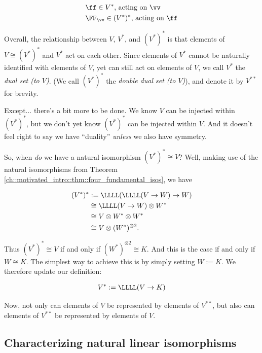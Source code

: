 \begin{deriv}
	\begin{align*}
		&\ff \in V^* \text{, acting on $\vv$} \\
		&\FF_{\vv} \in (V^*)^* \text{, acting on $\ff$}
	\end{align*}
	 
	 Overall, the relationship between $V$, $V^*$, and $(V^*)^*$ is that elements of $V \cong (V^*)^*$ and $V^*$ act on each other. Since elements of $V^*$ cannot be naturally identified with elements of $V$, yet can still act on elements of $V$, we call $V^*$ the \textit{dual set (to $V$)}. (We call $(V^*)^*$ the \textit{double dual set (to $V$)}), and denote it by $V^{**}$ for brevity.
	 
	 Except... there's a bit more to be done. We know $V$ can be injected within $(V^*)^*$, but we don't yet know $(V^*)^*$ can be injected within $V$. And it doesn't feel right to say we have ``duality'' \textit{unless} we also have symmetry. 
	 
	 So, when \textit{do} we have a natural isomorphism $(V^*)^* \cong V$? Well, making use of the natural isomorphisms from Theorem \ref{ch::motivated_intro::thm::four_fundamental_isos}, we have
	
	\begin{align*}
		(V^*)^* &:= \LLLL(\LLLL(V \rightarrow W) \rightarrow W) \\ &\cong \LLLL(V \rightarrow W) \otimes W^* \\
		&\cong V \otimes W^* \otimes W^* \\
		&\cong V \otimes (W^*)^{\otimes 2}.
	\end{align*}
	
	Thus $(V^*)^* \cong V$ if and only if $(W^*)^{\otimes 2} \cong K$. And this is the case if and only if $W \cong K$. The simplest way to achieve this is by simply setting $W := K$. We therefore update our definition:
	
	\begin{align*}
		V^* := \LLLL(V \rightarrow K)
	\end{align*} 
	
	Now, not only can elements of $V$ be represented by elements of $V^{**}$, but also can elements of $V^{**}$ be represented by elements of $V$.
\end{deriv}

\subsection*{Characterizing natural linear isomorphisms}

